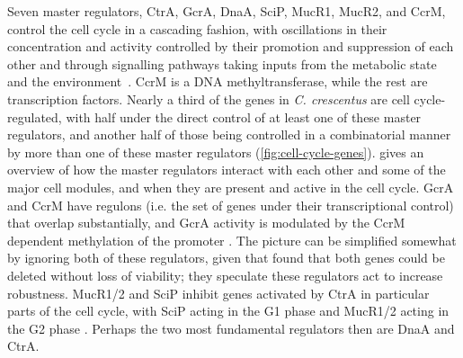 Seven master regulators, CtrA, GcrA, DnaA, SciP, MucR1, MucR2, and CcrM, control the cell cycle in a cascading fashion, with oscillations in their concentration and activity controlled by their promotion and suppression of each other and through signalling pathways taking inputs from the metabolic state and the environment~\cite{lasker2016}.
CcrM is a DNA methyltransferase, while the rest are transcription factors.
Nearly a third of the genes in \textit{C. crescentus} are cell cycle-regulated, with half under the direct control of at least one of these master regulators, and another half of those being controlled in a combinatorial manner by more than one of these master regulators (\cref{fig:cell-cycle-genes}).
 gives an overview of how the master regulators interact with each other and some of the major cell modules, and when they are present and active in the cell cycle.
GcrA and CcrM have regulons (i.e. the set of genes under their transcriptional control) that overlap substantially, and GcrA activity is modulated by the CcrM dependent methylation of the promoter \cite{mouammine2018}.
The picture can be simplified somewhat by ignoring both of these regulators, given that \textcite{murray2013} found that both genes could be deleted without loss of viability; they speculate these regulators act to increase robustness.
MucR1/2 and SciP inhibit genes activated by CtrA in particular parts of the cell cycle, with SciP acting in the G1 phase and MucR1/2 acting in the G2 phase \cite{collier2016,fumeaux2014}.
Perhaps the two most fundamental regulators then are DnaA and CtrA.

